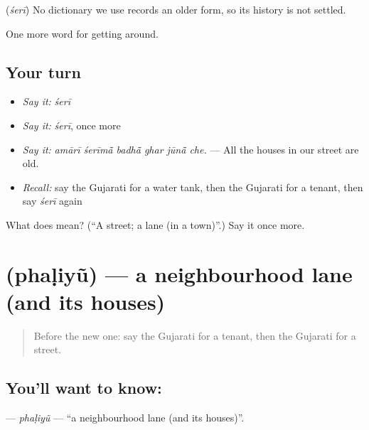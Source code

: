 \begin{cousinweb}
\textbf{} (\emph{śerī}) No dictionary we use records an older form, so its history is not settled.
\end{cousinweb}

\begin{grammarlens}[title={What you've built}]
One more word for getting around.
\end{grammarlens}

\subsection*{Your turn}
\begin{itemize}
\raggedright
  \item \emph{Say it:} \emph{śerī}
  \item \emph{Say it:} \emph{śerī}, once more
  \item \emph{Say it:} \emph{amārī śerīmā̃ badhā̃ ghar jūnā̃ che.} — All the houses in our street are old.
  \item \emph{Recall:} say the Gujarati for a water tank, then the Gujarati for a tenant, then say \emph{śerī} again
\end{itemize}

\begin{tcolorbox}[breakable,colback=teal!4,colframe=teal!35!black,title={Before you move on}]
What does  mean? (\textquotedblleft{}A street; a lane (in a town)\textquotedblright{}.) Say it once more.
\end{tcolorbox}
\section[\texorpdfstring{\gu{ફળિયું} (phaḷiyũ)}{ફળિયું (phaḷiyũ)}]{ (phaḷiyũ) — a neighbourhood lane (and its houses)}

\label{lesson:GU-C419-phaliyu}



\begin{quote}
Before the new one: say the Gujarati for a tenant, then the Gujarati for a street.
\end{quote}

\subsection*{You'll want to know: }
\textbf{} — \emph{phaḷiyũ} — \textquotedblleft{}a neighbourhood lane (and its houses)\textquotedblright{}.

